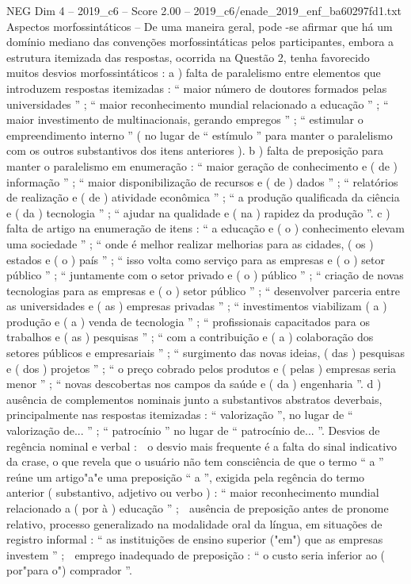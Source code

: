\begin{textsample}{NEG Dim 4 – 2019\_c6 – Score 2.00 – 2019\_c6/enade\_2019\_enf\_ba60297fd1.txt}
Aspectos morfossintáticos – De uma maneira geral, pode -se afirmar que há um domínio mediano das convenções morfossintáticas pelos participantes, embora a estrutura itemizada das respostas, ocorrida na Questão 2, tenha favorecido muitos desvios morfossintáticos : a ) falta de paralelismo entre elementos que introduzem respostas itemizadas : “ maior número de doutores formados pelas universidades ” ; “ maior reconhecimento mundial relacionado a educação ” ; “ maior investimento de multinacionais, gerando empregos ” ; “ estimular o empreendimento interno ” ( no lugar de “ estímulo ” para manter o paralelismo com os outros substantivos dos itens anteriores ). b ) falta de preposição para manter o paralelismo em enumeração : “ maior geração de conhecimento e ( de ) informação ” ; “ maior disponibilização de recursos e ( de ) dados ” ; “ relatórios de realização e ( de ) atividade econômica ” ; “ a produção qualificada da ciência e ( da ) tecnologia ” ; “ ajudar na qualidade e ( na ) rapidez da produção ”. c ) falta de artigo na enumeração de itens : “ a educação e ( o ) conhecimento elevam uma sociedade ” ; “ onde é melhor realizar melhorias para as cidades, ( os ) estados e ( o ) país ” ; “ isso volta como serviço para as empresas e ( o ) setor público ” ; “ juntamente com o setor privado e ( o ) público ” ; “ criação de novas tecnologias para as empresas e ( o ) setor público ” ; “ desenvolver parceria entre as universidades e ( as ) empresas privadas ” ; “ investimentos viabilizam ( a ) produção e ( a ) venda de tecnologia ” ; “ profissionais capacitados para os trabalhos e ( as ) pesquisas ” ; “ com a contribuição e ( a ) colaboração dos setores públicos e empresariais ” ; “ surgimento das novas ideias, ( das ) pesquisas e ( dos ) projetos ” ; “ o preço cobrado pelos produtos e ( pelas ) empresas seria menor ” ; “ novas descobertas nos campos da saúde e ( da ) engenharia ”. d ) ausência de complementos nominais junto a substantivos abstratos deverbais, principalmente nas respostas itemizadas : “ valorização ”, no lugar de “ valorização de... ” ; “ patrocínio ” no lugar de “ patrocínio de... ”.
Desvios de regência nominal e verbal :  o desvio mais frequente é a falta do sinal indicativo da crase, o que revela que o usuário não tem consciência de que o termo “ a ” reúne um artigo"a"e uma preposição “ a ”, exigida pela regência do termo anterior ( substantivo, adjetivo ou verbo ) : “ maior reconhecimento mundial relacionado a ( por à ) educação ” ;  ausência de preposição antes de pronome relativo, processo generalizado na modalidade oral da língua, em situações de registro informal : “ as instituições de ensino superior ("em") que as empresas investem ” ;  emprego inadequado de preposição : “ o custo seria inferior ao ( por"para o") comprador ”.

\end{textsample}
